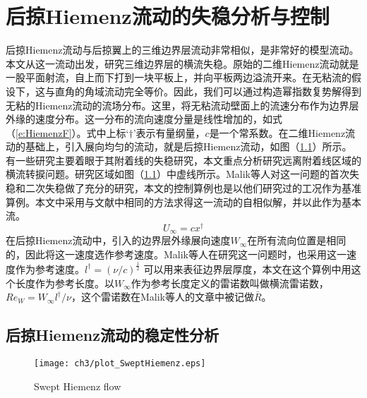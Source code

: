 \chapter{后掠Hiemenz流动的失稳分析与控制}
后掠Hiemenz流动与后掠翼上的三维边界层流动非常相似，是非常好的模型流动。本文从这一流动出发，研究三维边界层的横流失稳。原始的二维Hiemenz流动就是一股平面射流，自上而下打到一块平板上，并向平板两边溢流开来。在无粘流的假设下，这与直角的角域流动完全等价。因此，我们可以通过构造幂指数复势解得到无粘的Hiemenz流动的流场分布。这里，将无粘流动壁面上的流速分布作为边界层外缘的速度分布。这一分布的流向速度分量是线性增加的，如式（\ref{e:HiemenzF}）。式中上标`$\dagger$'表示有量纲量，$c$是一个常系数。在二维Hiemenz流动的基础上，引入展向均匀的流动，就是后掠Hiemenz流动，如图（\ref{fig:SweptHiemenz}）所示。有一些研究主要着眼于其附着线的失稳研究\cite{Lin1996,Guegan2006}，本文重点分析研究远离附着线区域的横流转捩问题。研究区域如图（\ref{fig:SweptHiemenz}）中虚线所示。Malik等人\cite{Malik1994}对这一问题的首次失稳和二次失稳做了充分的研究，本文的控制算例也是以他们研究过的工况作为基准算例。本文中采用与文献中\cite{Malik1994}相同的方法求得这一流动的自相似解，并以此作为基本流。
\begin{equation}\label{e:HiemenzF}
  U_{\infty}=cx^{\dagger}
\end{equation}
在后掠Hiemenz流动中，引入的边界层外缘展向速度$W_{\infty}$在所有流向位置是相同的，因此将这一速度选作参考速度。Malik等人在研究这一问题时，也采用这一速度作为参考速度。$l^\dagger=(\nu/c)^{\frac{1}{2}}$ 可以用来表征边界层厚度，本文在这个算例中用这个长度作为参考长度。以$W_{\infty}$作为参考长度定义的雷诺数叫做横流雷诺数，$Re_W=W_{\infty}l^\dagger/\nu$，这个雷诺数在Malik等人的文章\cite{Malik1994}中被记做$\bar{R}$。
\section{后掠Hiemenz流动的稳定性分析}
\begin{figure}[htb]
  \centering
  \texttt{[image: ch3/plot\_SweptHiemenz.eps]}\\
  \caption{Swept Hiemenz flow}\label{fig:SweptHiemenz}
\end{figure}


